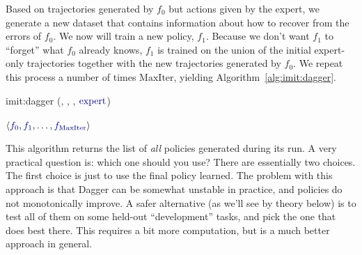Based on trajectories generated by $f_0$ but actions given by the expert, we generate a new dataset that contains information about how to recover from the errors of $f_0$.
We now will train a new policy, $f_1$.
Because we don't want $f_1$ to ``forget'' what $f_0$ already knows, $f_1$ is trained on the union of the initial expert-only trajectories together with the new trajectories generated by $f_0$.
We repeat this process a number of times $\text{MaxIter}$, yielding Algorithm~\ref{alg:imit:dagger}.

\newalgorithm%
  {imit:dagger}%
  {(\VARm{\cA}, , , $\VARm{\text{expert}}$)}
  {
                   \\
                   \\
    \ENDFOR
    \RETURN $\left\langle \VARm{f_0}, \VARm{f_1}, \dots, \VARm{f_{\text{MaxIter}}} \right\rangle$
  }

This algorithm returns the list of \emph{all} policies generated during its run.
A very practical question is: which one should you use?
There are essentially two choices. The first choice is just to use the final policy learned.
The problem with this approach is that Dagger can be somewhat unstable in practice, and policies do not monotonically improve.
A safer alternative (as we'll see by theory below) is to test all of them on some held-out ``development'' tasks, and pick the one that does best there.
This requires a bit more computation, but is a much better approach in general.

